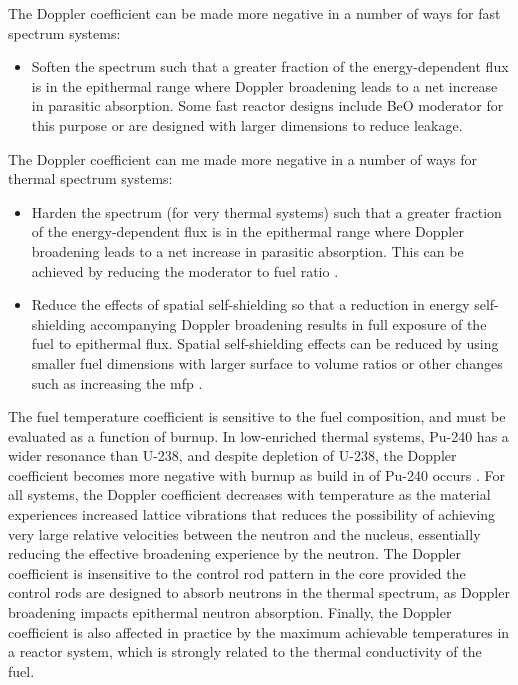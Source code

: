 The Doppler coefficient can be made more negative in a number of ways for fast spectrum systems:

\begin{itemize}
\item Soften the spectrum such that a greater fraction of the energy-dependent flux is in the epithermal range where Doppler broadening leads to a net increase in parasitic absorption. Some fast reactor designs include BeO moderator for this purpose or are designed with larger dimensions to reduce leakage.
\end{itemize}

The Doppler coefficient can me made more negative in a number of ways for thermal spectrum systems:

\begin{itemize}
\item Harden the spectrum (for very thermal systems) such that a greater fraction of the energy-dependent flux is in the epithermal range where Doppler broadening leads to a net increase in parasitic absorption. This can be achieved by reducing the moderator to fuel ratio \cite{fratoni}.
\item Reduce the effects of spatial self-shielding so that a reduction in energy self-shielding accompanying Doppler broadening results in full exposure of the fuel to epithermal flux. Spatial self-shielding effects can be reduced by using smaller fuel dimensions with larger surface to volume ratios \cite{fratoni} or other changes such as increasing the \gls{mfp} \cite{duderstadt}.
\end{itemize}


The fuel temperature coefficient is sensitive to the fuel composition, and must be evaluated as a function of burnup. In low-enriched thermal systems, Pu-240 has a wider resonance than U-238, and despite depletion of U-238, the Doppler coefficient becomes more negative with burnup as build in of Pu-240 occurs \cite{duderstadt,fratoni}. For all systems, the Doppler coefficient decreases with temperature as the material experiences increased lattice vibrations that reduces the possibility of achieving very large relative velocities between the neutron and the nucleus, essentially reducing the effective broadening experience by the neutron. The Doppler coefficient is insensitive to the control rod pattern in the core provided the control rods are designed to absorb neutrons in the thermal spectrum, as Doppler broadening impacts epithermal neutron absorption. Finally, the Doppler coefficient is also affected in practice by the maximum achievable temperatures in a reactor system, which is strongly related to the thermal conductivity of the fuel.

